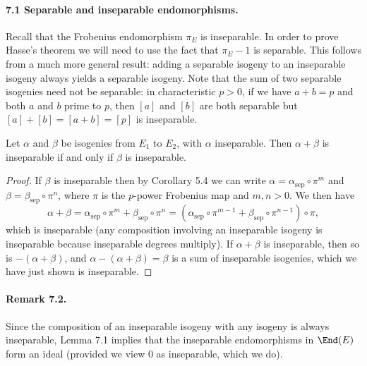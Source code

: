 \paragraph{7.1 Separable and inseparable endomorphisms.}
Recall that the Frobenius endomorphism $\pi_E$ is inseparable. In order to prove Hasse's theorem we will need to use the fact that $\pi_E-1$ is separable. This follows from a much more general result: adding a separable isogeny to an inseparable isogeny always yields a separable isogeny. Note that the sum of two separable isogenies need not be separable: in characteristic $p>0$, if we have $a+b=p$ and both $a$ and $b$ prime to $p$, then $[a]$ and $[b]$ are both separable but $[a]+[b]=[a+b]=[p]$ is inseparable.

\begin{lemma}[7.1]
Let $\alpha$ and $\beta$ be isogenies from $E_1$ to $E_2$, with $\alpha$ inseparable. Then $\alpha+\beta$ is inseparable if and only if $\beta$ is inseparable.
\end{lemma}
\begin{proof}
If $\beta$ is inseparable then by Corollary 5.4 we can write $\alpha=\alpha_{\mathrm{sep}}\circ\pi^m$ and $\beta=\beta_{\mathrm{sep}}\circ\pi^n$, where $\pi$ is the $p$-power Frobenius map and $m,n>0$. We then have
\[
\alpha+\beta=\alpha_{\mathrm{sep}}\circ\pi^m+\beta_{\mathrm{sep}}\circ\pi^n
=(\alpha_{\mathrm{sep}}\circ\pi^{m-1}+\beta_{\mathrm{sep}}\circ\pi^{n-1})\circ\pi,
\]
which is inseparable (any composition involving an inseparable isogeny is inseparable because inseparable degrees multiply). If $\alpha+\beta$ is inseparable, then so is $-(\alpha+\beta)$, and $\alpha-(\alpha+\beta)=\beta$ is a sum of inseparable isogenies, which we have just shown is inseparable.
\end{proof}

\paragraph{Remark 7.2.}
Since the composition of an inseparable isogeny with any isogeny is always inseparable, Lemma 7.1 implies that the inseparable endomorphisms in $\End(E)$ form an ideal (provided we view $0$ as inseparable, which we do).

